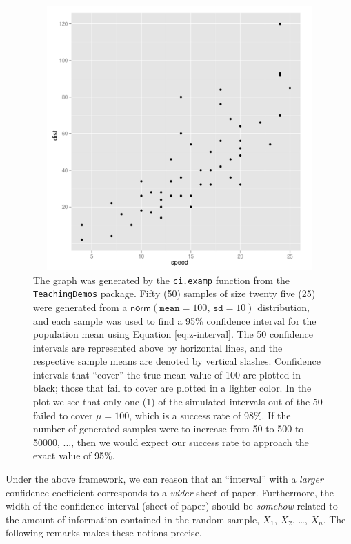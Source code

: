 \documentclass[captions=tableheading]{scrbook}
\begin{document}
\begin{figure}[th]
    \includegraphics[width=5in, height=4in]{img/carscatter.pdf}
    \caption[Simulated confidence intervals]{\small The graph was generated by the \texttt{ci.examp} function from the \texttt{TeachingDemos} package. Fifty (50) samples of size twenty five (25) were generated from a \( \mathsf{norm}(\mathtt{mean}=100,\,\mathtt{sd}=10) \) distribution, and each sample was used to find a 95\% confidence interval for the population mean using Equation \ref{eq:z-interval}. The 50 confidence intervals are represented above by horizontal lines, and the respective sample means are denoted by vertical slashes. Confidence intervals that ``cover'' the true mean value of 100 are plotted in black; those that fail to cover are plotted in a lighter color. In the plot we see that only one (1) of the simulated intervals out of the 50 failed to cover \(\mu=100\), which is a success rate of 98\%. If the number of generated samples were to increase from 50 to 500 to 50000, ..., then we would expect our success rate to approach the exact value of 95\%.}
    \label{fig:Scatter-cars}
  \end{figure}

Under the above framework, we can reason that an ``interval'' with a \emph{larger} confidence coefficient corresponds to a \emph{wider} sheet of paper. Furthermore, the width of the confidence interval (sheet of paper) should be \emph{somehow} related to the amount of information contained in the random sample, \(X_{1}\), \(X_{2}\), \ldots{},
\(X_{n}\). The following remarks makes these notions precise. 
\end{document}
